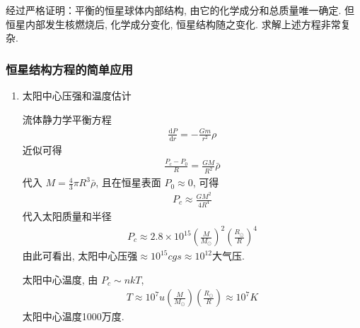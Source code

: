 经过严格证明：平衡的恒星球体内部结构, 由它的化学成分和总质量唯一确定. 但恒星内部发生核燃烧后, 化学成分变化, 恒星结构随之变化. 求解上述方程非常复杂. 

\subsubsection{恒星结构方程的简单应用}
\begin{enumerate}
    \item 太阳中心压强和温度估计
    
    流体静力学平衡方程
    \begin{align*}
        \frac{\mathrm{d}P}{\mathrm{d}r}=-\frac{Gm}{r^2}\rho
    \end{align*}
    近似可得
    \begin{align*}
        \frac{P_c-P_0}{R}=\frac{GM}{R^2}\bar{\rho}
    \end{align*}
    代入 $M=\frac{4}{3}\pi R^3 \bar{\rho}$, 且在恒星表面 $P_0\approx 0$,  可得
    \begin{align*}
        P_c\approx \frac{GM^2}{4R^4}
    \end{align*}
    代入太阳质量和半径
    \begin{align*}
        P_c\approx 2.8\times 10^{15}\left( \frac{M}{M_{\odot}} \right)^2 \left( \frac{R_{\odot}}{R} \right)^4
    \end{align*}
    由此可看出, 太阳中心压强$\approx 10^{15} cgs \approx 10^{12}$大气压. 

    太阳中心温度, 由 $P_c\sim nkT$, 
    \begin{align*}
        T\approx 10^7 u \left( \frac{M}{M_{\odot}} \right) \left( \frac{R_{\odot}}{R} \right) \approx 10^7 K
    \end{align*}
    太阳中心温度1000万度. 


\end{enumerate}
